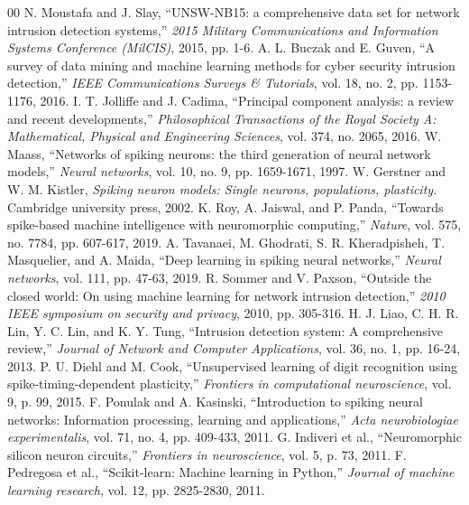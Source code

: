 \documentclass{ieeeaccess}
\begin{document}
\begin{thebibliography}{00}
 N. Moustafa and J. Slay, ``UNSW-NB15: a comprehensive data set for network intrusion detection systems,'' \textit{2015 Military Communications and Information Systems Conference (MilCIS)}, 2015, pp. 1-6.
 A. L. Buczak and E. Guven, ``A survey of data mining and machine learning methods for cyber security intrusion detection,'' \textit{IEEE Communications Surveys \& Tutorials}, vol. 18, no. 2, pp. 1153-1176, 2016.
 I. T. Jolliffe and J. Cadima, ``Principal component analysis: a review and recent developments,'' \textit{Philosophical Transactions of the Royal Society A: Mathematical, Physical and Engineering Sciences}, vol. 374, no. 2065, 2016.
 W. Maass, ``Networks of spiking neurons: the third generation of neural network models,'' \textit{Neural networks}, vol. 10, no. 9, pp. 1659-1671, 1997.
 W. Gerstner and W. M. Kistler, \textit{Spiking neuron models: Single neurons, populations, plasticity}. Cambridge university press, 2002.
 K. Roy, A. Jaiswal, and P. Panda, ``Towards spike-based machine intelligence with neuromorphic computing,'' \textit{Nature}, vol. 575, no. 7784, pp. 607-617, 2019.
 A. Tavanaei, M. Ghodrati, S. R. Kheradpisheh, T. Masquelier, and A. Maida, ``Deep learning in spiking neural networks,'' \textit{Neural networks}, vol. 111, pp. 47-63, 2019.
 R. Sommer and V. Paxson, ``Outside the closed world: On using machine learning for network intrusion detection,'' \textit{2010 IEEE symposium on security and privacy}, 2010, pp. 305-316.
 H. J. Liao, C. H. R. Lin, Y. C. Lin, and K. Y. Tung, ``Intrusion detection system: A comprehensive review,'' \textit{Journal of Network and Computer Applications}, vol. 36, no. 1, pp. 16-24, 2013.
 P. U. Diehl and M. Cook, ``Unsupervised learning of digit recognition using spike-timing-dependent plasticity,'' \textit{Frontiers in computational neuroscience}, vol. 9, p. 99, 2015.
 F. Ponulak and A. Kasinski, ``Introduction to spiking neural networks: Information processing, learning and applications,'' \textit{Acta neurobiologiae experimentalis}, vol. 71, no. 4, pp. 409-433, 2011.
 G. Indiveri et al., ``Neuromorphic silicon neuron circuits,'' \textit{Frontiers in neuroscience}, vol. 5, p. 73, 2011.
 F. Pedregosa et al., ``Scikit-learn: Machine learning in Python,'' \textit{Journal of machine learning research}, vol. 12, pp. 2825-2830, 2011.
\end{thebibliography}
\end{document}
